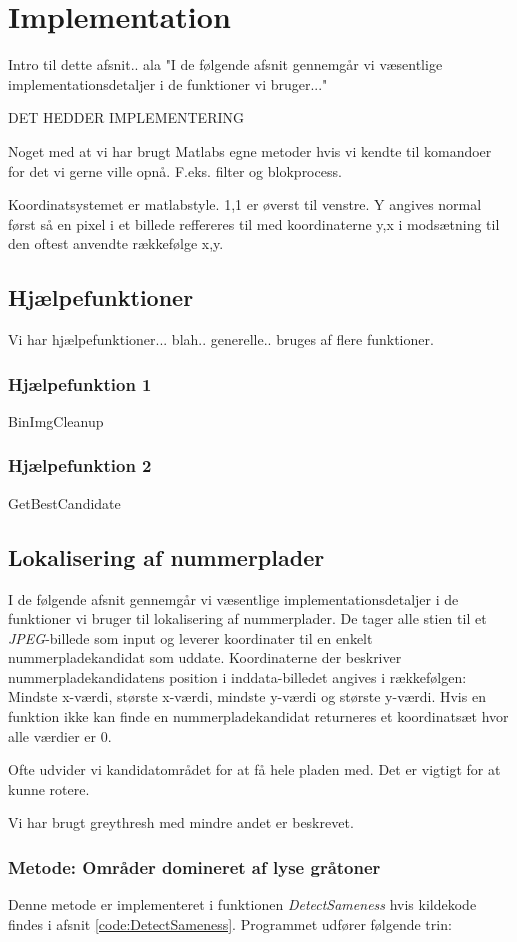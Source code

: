 \section{Implementation}
\label{sec:implementation}

Intro til dette afsnit.. ala "I de følgende afsnit gennemgår vi væsentlige implementationsdetaljer i de funktioner vi bruger..."

DET HEDDER IMPLEMENTERING

Noget med at vi har brugt Matlabs egne metoder hvis vi kendte til komandoer for det vi gerne ville opnå. F.eks. filter og blokprocess.

Koordinatsystemet er matlabstyle. 1,1 er øverst til venstre. Y angives normal først så en pixel i et billede reffereres til med koordinaterne y,x i modsætning til den oftest anvendte rækkefølge x,y. 

\subsection{Hjælpefunktioner}
Vi har hjælpefunktioner... blah.. generelle.. bruges af flere funktioner.
\subsubsection{Hjælpefunktion 1}
BinImgCleanup
\subsubsection{Hjælpefunktion 2}
GetBestCandidate

\subsection{Lokalisering af nummerplader}
I de følgende afsnit gennemgår vi væsentlige implementationsdetaljer i de funktioner vi bruger til lokalisering af nummerplader. De tager alle stien til et \textit{JPEG}-billede som input og leverer koordinater til en enkelt nummerpladekandidat som uddate. Koordinaterne der beskriver nummerpladekandidatens position i inddata-billedet angives i rækkefølgen: Mindste x-værdi, største x-værdi, mindste y-værdi og største y-værdi. Hvis en funktion ikke kan finde en nummerpladekandidat returneres et koordinatsæt hvor alle værdier er 0.

Ofte udvider vi kandidatområdet for at få hele pladen med. Det er vigtigt for at kunne rotere.

Vi har brugt greythresh med mindre andet er beskrevet.
\subsubsection{Metode: Områder domineret af lyse gråtoner}
Denne metode er implementeret i funktionen \textit{DetectSameness} hvis kildekode findes i afsnit \vref{code:DetectSameness}. Programmet udfører følgende trin:

